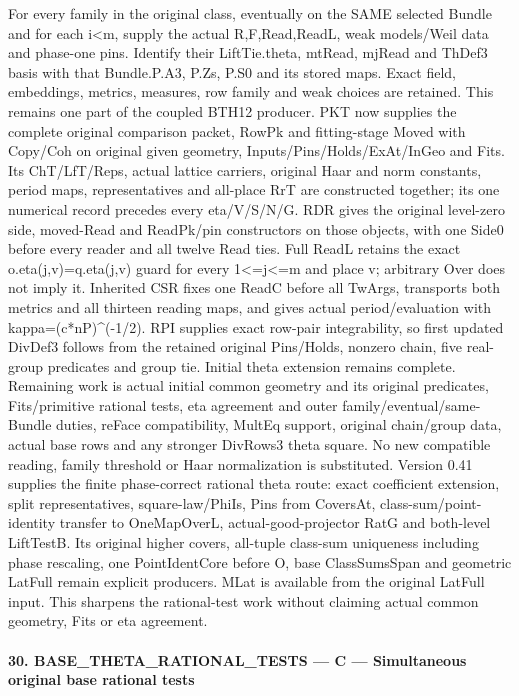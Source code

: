 \documentclass[11pt,a4paper]{article}
\numberwithin{equation}{section}
\theoremstyle{remark}\newtheorem{remark}[theorem]{Remark}
\begin{document}
For every family in the original class, eventually on the SAME selected Bundle and for each i<m, supply the actual R,F,Read,ReadL, weak models/Weil data and phase-one pins. Identify their LiftTie.theta, mtRead, mjRead and ThDef3 basis with that Bundle.P.A3, P.Zs, P.S0 and its stored maps. Exact field, embeddings, metrics, measures, row family and weak choices are retained. This remains one part of the coupled BTH12 producer. PKT now supplies the complete original comparison packet, RowPk and fitting-stage Moved with Copy/Coh on original given geometry, Inputs/Pins/Holds/ExAt/InGeo and Fits. Its ChT/LfT/Reps, actual lattice carriers, original Haar and norm constants, period maps, representatives and all-place RrT are constructed together; its one numerical record precedes every eta/V/S/N/G. RDR gives the original level-zero side, moved-Read and ReadPk/pin constructors on those objects, with one Side0 before every reader and all twelve Read ties. Full ReadL retains the exact o.eta(j,v)=q.eta(j,v) guard for every 1<=j<=m and place v; arbitrary Over does not imply it. Inherited CSR fixes one ReadC before all TwArgs, transports both metrics and all thirteen reading maps, and gives actual period/evaluation with kappa=(c*nP)\textasciicircum{}(-1/2). RPI supplies exact row-pair integrability, so first updated DivDef3 follows from the retained original Pins/Holds, nonzero chain, five real-group predicates and group tie. Initial theta extension remains complete. Remaining work is actual initial common geometry and its original predicates, Fits/primitive rational tests, eta agreement and outer family/eventual/same-Bundle duties, reFace compatibility, MultEq support, original chain/group data, actual base rows and any stronger DivRows3 theta square. No new compatible reading, family threshold or Haar normalization is substituted. Version 0.41 supplies the finite phase-correct rational theta route: exact coefficient extension, split representatives, square-law/PhiIs, Pins from CoversAt, class-sum/point-identity transfer to OneMapOverL, actual-good-projector RatG and both-level LiftTestB. Its original higher covers, all-tuple class-sum uniqueness including phase rescaling, one PointIdentCore before O, base ClassSumsSpan and geometric LatFull remain explicit producers. MLat is available from the original LatFull input. This sharpens the rational-test work without claiming actual common geometry, Fits or eta agreement.



\paragraph{30. BASE\_\allowbreak THETA\_\allowbreak RATIONAL\_\allowbreak TESTS — C — Simultaneous original base rational tests}
\end{document}

